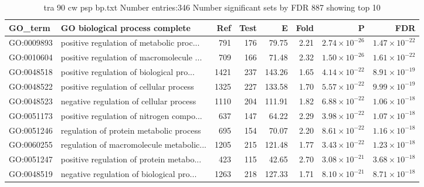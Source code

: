 \begin{table}[ht]
\centering
\begin{adjustbox}{width=\textwidth}
\begin{tabular}{llrrrrrr}
  \hline
GO\_term & GO biological process complete & Ref & Test & E & Fold & P & FDR \\ 
  \hline
GO:0009893 & positive regulation of metabolic proc... & 791 & 176 & 79.75 & 2.21 & $2.74 \times 10^{-26}$ & $1.47 \times 10^{-22}$ \\ 
  GO:0010604 & positive regulation of macromolecule ... & 709 & 166 & 71.48 & 2.32 & $1.50 \times 10^{-26}$ & $1.61 \times 10^{-22}$ \\ 
  GO:0048518 & positive regulation of biological pro... & 1421 & 237 & 143.26 & 1.65 & $4.14 \times 10^{-22}$ & $8.91 \times 10^{-19}$ \\ 
  GO:0048522 & positive regulation of cellular process  & 1325 & 227 & 133.58 & 1.70 & $5.57 \times 10^{-22}$ & $9.99 \times 10^{-19}$ \\ 
  GO:0048523 & negative regulation of cellular process  & 1110 & 204 & 111.91 & 1.82 & $6.88 \times 10^{-22}$ & $1.06 \times 10^{-18}$ \\ 
  GO:0051173 & positive regulation of nitrogen compo... & 637 & 147 & 64.22 & 2.29 & $3.98 \times 10^{-22}$ & $1.07 \times 10^{-18}$ \\ 
  GO:0051246 & regulation of protein metabolic process  & 695 & 154 & 70.07 & 2.20 & $8.61 \times 10^{-22}$ & $1.16 \times 10^{-18}$ \\ 
  GO:0060255 & regulation of macromolecule metabolic... & 1205 & 215 & 121.48 & 1.77 & $3.43 \times 10^{-22}$ & $1.23 \times 10^{-18}$ \\ 
  GO:0051247 & positive regulation of protein metabo... & 423 & 115 & 42.65 & 2.70 & $3.08 \times 10^{-21}$ & $3.68 \times 10^{-18}$ \\ 
  GO:0048519 & negative regulation of biological pro... & 1263 & 218 & 127.33 & 1.71 & $8.10 \times 10^{-21}$ & $8.71 \times 10^{-18}$ \\ 
  \hline
\end{tabular}
\end{adjustbox}
\caption{tra 90 cw psp bp.txt Number entries:346 Number significant sets by FDR 887 showing top 10} 
\label{tab:tra 90 cw psp bp.txt Number entries:346 Number significant sets by FDR 887 showing top 10}
\end{table}

